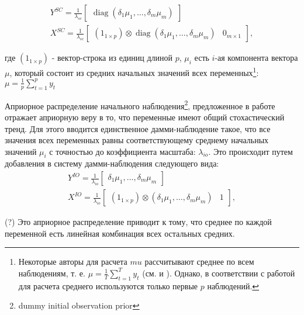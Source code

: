 \documentclass[11pt]{article} %
\DeclareMathOperator{\diag}{diag}
\newcommand{\post}{\overline}
\begin{document}
\begin{gather}
Y^{SC}=\frac{1}{\lambda_{sc}}\begin{bmatrix}\diag(\delta_1\mu_1,\ldots,\delta_m\mu_m)\end{bmatrix}\\
X^{SC}=\frac{1}{\lambda_{sc}}\begin{bmatrix}(1_{1\times p})\otimes \diag(\delta_1\mu_1,\ldots,\delta_m\mu_m) &0_{m\times 1}\end{bmatrix},
\end{gather}

где $(1_{1\times p})$ - вектор-строка из единиц длиной $p$, $\mu_i$ есть $i$-ая компонента вектора $\mu$, который состоит из средних начальных значений всех переменных\footnote{Некоторые авторы для  расчета $mu$ рассчитывают среднее по всем наблюдениям, т. е. $\mu=\frac{1}{T}\sum_{t=1}^T y_t$ (см. \cite{banbura_al_2010} и \cite{carriero_al_2015}). Однако, в соответствии с работой \cite{sims_zha_1998} для расчета среднего используются только первые $p$ наблюдений.}: $\mu=\frac{1}{p}\sum_{t=1}^p y_t$  

Априорное распределение начального наблюдения\footnote{dummy initial observation prior }, предложенное в работе \cite{sims_1993} отражает априорную веру в то, что переменные имеют общий стохастический тренд. Для этого вводится единственное дамми-наблюдение такое, что все значения всех переменных равны соответствующему среднему начальных значений $\mu_i$ с точностью до коэффициента масштаба: $\lambda_{io}$. Это происходит  путем добавления в систему дамми-наблюдения следующего вида:
\begin{gather}
Y^{IO}=\frac{1}{\lambda_{io}}\begin{bmatrix}
\delta_1\mu_1,\ldots,\delta_m\mu_m
\end{bmatrix}\\
X^{IO}=\frac{1}{\lambda_{io}}\begin{bmatrix}
(1_{1\times p})\otimes (\delta_1\mu_1,\ldots,\delta_m\mu_m) &1
\end{bmatrix},
\end{gather}

(?) Это априорное распределение приводит к тому, что среднее по каждой переменной есть линейная комбинация всех остальных средних.



\end{document}

